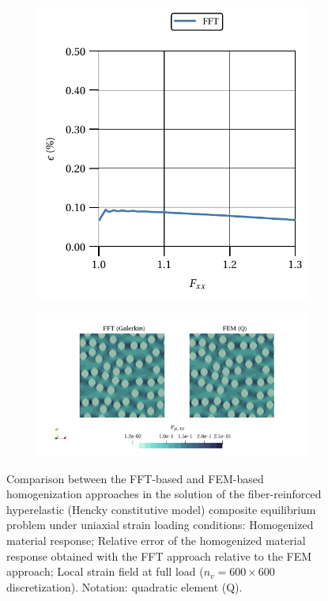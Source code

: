 \begin{figure}[hbt]
\begin{subfigure}[b]{0.49\textwidth}
    \includegraphics[width=\textwidth]{figures/hencky_2D_normal_material_response_error}
    \caption{}
    \label{subfig:hencky_2D_normal_material_response_error}
  \end{subfigure}
  \begin{subfigure}[b]{\textwidth}
    \centering
    \includegraphics[width=\textwidth]{figures/hencky_2D_normal_strain_11}
    \caption{}
    \label{subfig:hencky_2D_normal_strain_11}
  \end{subfigure}
  \caption{Comparison between the FFT-based and FEM-based homogenization approaches in the
  solution of the fiber-reinforced hyperelastic (Hencky constitutive model) composite equilibrium problem under uniaxial
  strain loading conditions:  Homogenized material response;  Relative error of the homogenized material response obtained with the FFT approach relative to the FEM approach;  Local strain field at full load (\(n_v = 600 \times 600\)
  discretization). Notation: quadratic element (Q).}
\label{fig:hencky_mat_res_2D_normal}
\end{figure}

